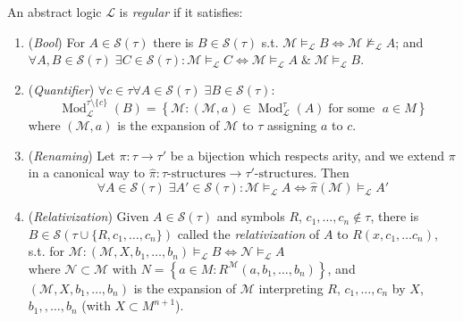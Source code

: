 \documentclass[UTF8,11pt,colorlinks,compress,openany]{beamer}%
\begin{document}
\begin{frame}\frametitle{}\vspace{-1ex}
	\begin{definition}
		An abstract logic $\mathcal{L}$ is \emph{regular} if it satisfies:
		\begin{enumerate}
			\item (\emph{Bool}) For $A\in\mathcal{S}(\tau)$ there is $B\in \mathcal{S}(\tau)$ s.t. $\mathcal{M}\vDash_{\mathcal{L}} B\iff\mathcal{M}\nvDash_{\mathcal{L}} A$; and $\forall A, B\in \mathcal{S}(\tau)\;\exists C\in \mathcal{S}(\tau): \mathcal{M}\vDash_{\mathcal{L}} C\iff\mathcal{M}\vDash_{\mathcal{L}} A\;\&\;\mathcal{M}\vDash_{\mathcal{L}} B$.
			\item (\emph{Quantifier}) $\forall c\in\tau\forall A \in \mathcal{S}(\tau)\;\exists B \in \mathcal{S}(\tau):$\vspace{-1ex}
			\[
			\operatorname{Mod}_{\mathcal{L}}^{\tau\setminus\!\{c\}}(B)=\left\{\mathcal{M}: (\mathcal{M},a) \in \operatorname{Mod}_{\mathcal{L}}^\tau(A)\;\text{for some }\;a \in M\right\}
			\]
			where $(\mathcal{M},a)$ is the expansion of $\mathcal{M}$ to $\tau$ assigning $a$ to $c$.
			\item (\emph{Renaming}) Let $\pi:\tau\to\tau'$ be a bijection which respects arity, and we extend $\pi$ in a canonical way to $\hat{\pi}:\tau\text{-structures}\to\tau'\text{-structures}$. Then\vspace{-1ex}
			\[\forall A\in \mathcal{S}(\tau)\;\exists A'\in \mathcal{S}(\tau): \mathcal{M}\vDash_{\mathcal{L}} A\iff\hat{\pi}(\mathcal{M})\vDash_{\mathcal{L}} A'\]
			\item (\emph{Relativization}) Given $A\in\mathcal{S}(\tau)$ and symbols $R$, $c_1,\dots,c_n\notin\tau$, there is $B\in\mathcal{S}(\tau\cup \{R,c_1,\ldots,c_n\})$ called the \emph{relativization} of $A$ to $R(x, c_1,\dots c_n)$, s.t. for $\mathcal{M}: (\mathcal{M},X, b_1,\ldots,b_n)\vDash_{\mathcal{L}} B \iff \mathcal{N} \vDash_{\mathcal{L}} A$\\
			where $\mathcal{N}\subset\mathcal{M}$ with $N=\left\{a\in M: R^{\mathcal{M}}(a, b_1, \dots, b_n)\right\}$, and $(\mathcal{M},X, b_1, \ldots,b_n)$ is the expansion of $\mathcal{M}$ interpreting $R$, $c_1,\dots,c_n$ by $X$, $b_1,,\dots,b_n$ (with $X
			\subset M^{n+1}$).
		\end{enumerate}
	\end{definition}
\end{frame}
\end{document}

